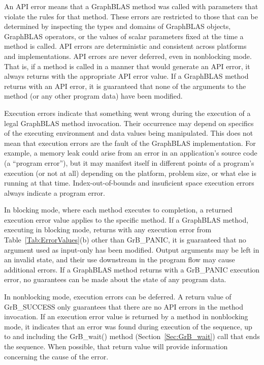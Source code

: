 An API error means that a GraphBLAS method was called with parameters that
violate the rules for that method.  These errors are restricted to those
that can be determined by inspecting the types and domains of GraphBLAS
objects, GraphBLAS operators, or the values of scalar parameters fixed at
the time a method is called.  API errors are deterministic and consistent
across platforms and implementations.  API errors are never deferred,
even in nonblocking mode. That is, if a method is called in a manner
that would generate an API error, it always returns with the appropriate
API error value.  If a GraphBLAS method returns with an API error, it
is guaranteed that none of the arguments to the method (or any other
program data) have been modified.

Execution errors indicate that something went wrong during the execution
of a legal GraphBLAS method invocation.  Their occurrence may depend on
specifics of the executing environment and data values being manipulated.
This does not mean that execution errors are the fault of the GraphBLAS
implementation.  For example, a memory leak could arise from an error in
an application's source code (a ``program error''), but it may manifest
itself in different points of a program's execution (or not at all)
depending on the platform, problem size, or what else is running at
that time.  Index-out-of-bounds and insuficient space execution errors
always indicate a program error.

In blocking mode, where each method executes to completion, a returned
execution error value applies to the specific method.  If a GraphBLAS
method, executing in blocking mode, returns with any execution error
from Table~\ref{Tab:ErrorValues}(b) other than {\sf GrB\_PANIC}, it
is guaranteed that no argument used as input-only has been modified.
Output arguments may be left in an invalid state, and their use downstream
in the program flow may cause additional errors.  If a GraphBLAS method
returns with a {\sf GrB\_PANIC} execution error, no guarantees can be
made about the state of any program data.

In nonblocking mode, execution errors can be deferred.  A return value
of {\sf GrB\_SUCCESS} only guarantees that there are no API errors in
the method invocation.  If an execution error value is returned by a
method in nonblocking mode, it indicates that an error was found during
execution of the sequence, up to and including the {\sf GrB\_wait()}
method (Section~\ref{Sec:GrB_wait}) call that ends the sequence. When possible, that return value
will provide information concerning the cause of the error.

